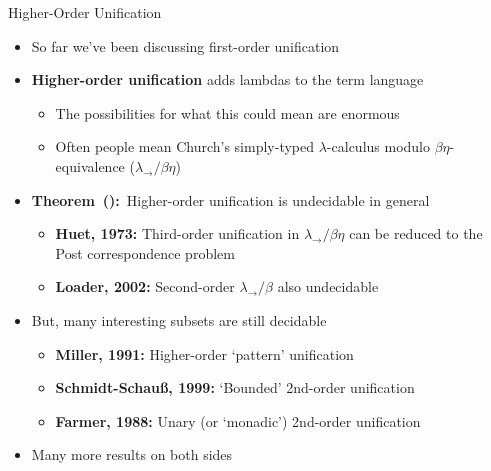 \documentclass[pdf,fyma2]{prosper} %
\makeatletter
\newcommand{\defn}[1]{\textbf{#1}}
\newcommand{\thm}[1][]{%
    \def\thm@tmp{#1}%
    \textbf{Theorem\ifx\thm@tmp\@empty\relax\else\ (\thm@tmp)\fi:}\ }
\makeatother
\begin{document}
\begin{slide}{Higher-Order Unification}
	\begin{itemize}
	\item So far we've been discussing first-order unification
	\item \defn{Higher-order unification} adds lambdas to the term language
    	\begin{itemize}
    	\item The possibilities for what this could mean are enormous
    	\item Often people mean Church's simply-typed $\lambda$-calculus modulo $\beta\eta$-equivalence ($\lambda_{\rightarrow}/\beta\eta$)
    	\end{itemize}
	\vspace{1em}
	\item \thm Higher-order unification is undecidable in general
    	\begin{itemize}
    	\item \textbf{Huet, 1973:} Third-order unification in $\lambda_{\rightarrow}/\beta\eta$ can be reduced to the Post correspondence problem
    	\item \textbf{Loader, 2002:} Second-order $\lambda_{\rightarrow}/\beta$ also undecidable
    	\end{itemize}
    \item But, many interesting subsets are still decidable
    	\begin{itemize}
    	\item \textbf{Miller, 1991:} Higher-order `pattern' unification
    	\item \textbf{Schmidt-Schau\ss, 1999:} `Bounded' 2nd-order unification
    	\item \textbf{Farmer, 1988:} Unary (or `monadic') 2nd-order unification
    	\end{itemize}
    \item Many more results on both sides
    \end{itemize}
\end{slide}
\end{document}
